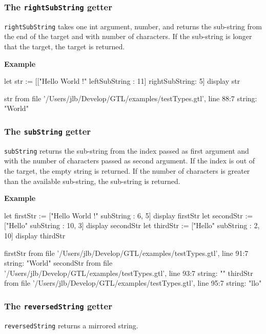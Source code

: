 \documentclass[10pt,openright,twosides,final]{memoir}
\newcommand{\gtlarg}[1]{{\footnotesize\ttfamily\colorbox{light-blue}{#1}}}
\newcommand{\gtlinline}[1]{\colorbox{light-blue}{\lstinline[language=gtl]{#1}}}
\newcommand{\example}{\vspace{.75em}\noindent\textbf{Example}\vspace{0em}}
\begin{document}
\subsubsection{The \texttt{rightSubString} getter}

\gtlinline{rightSubString} takes one int argument, \gtlarg{number}, and returns the sub-string from the end of the target and with \gtlarg{number} of characters. If the sub-string is longer that the target, the target is returned.

\example
\begin{gtl}
let str := [["Hello World !" leftSubString : 11] rightSubString: 5]
display str
\end{gtl}
\begin{console}
str from file '/Users/jlb/Develop/GTL/examples/testTypes.gtl', line 88:7
    string: "World"
\end{console}

\subsubsection{The \texttt{subString} getter}

\gtlinline{subString} returns the sub-string from the \gtlarg{index} passed as first argument and with the \gtlarg{number} of characters passed as second argument. If the \gtlarg{index} is out of the target, the empty string is returned. If the number of characters is greater than the available sub-string, the sub-string is returned. 

\example
\begin{gtl}
let firstStr := ["Hello World !" subString : 6, 5]
display firstStr
let secondStr := ["Hello" subString : 10, 3]
display secondStr
let thirdStr := ["Hello" subString : 2, 10]
display thirdStr
\end{gtl}
\begin{console}
firstStr from file '/Users/jlb/Develop/GTL/examples/testTypes.gtl', line 91:7
    string: "World"
secondStr from file '/Users/jlb/Develop/GTL/examples/testTypes.gtl', line 93:7
    string: ""
thirdStr from file '/Users/jlb/Develop/GTL/examples/testTypes.gtl', line 95:7
    string: "llo"
\end{console}

\subsubsection{The \texttt{reversedString} getter}

\gtlinline{reversedString} returns a mirrored string.
\end{document}
